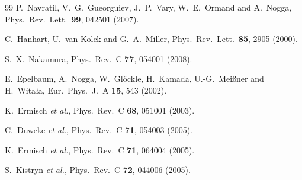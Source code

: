 \documentclass[aps,rmp,nofootinbib,twocolumn,floatfix]{revtex4}
\begin{document}
\begin{thebibliography}{99}
  P.~Navratil, V.~G.~Gueorguiev, J.~P.~Vary, W.~E.~Ormand and A.~Nogga,
  Phys.\ Rev.\ Lett.\  {\bf 99}, 042501 (2007).

  C.~Hanhart, U.~van Kolck and G.~A.~Miller,
  Phys.\ Rev.\ Lett.\  {\bf 85}, 2905 (2000).

  S.~X.~Nakamura,
  Phys.\ Rev.\  C {\bf 77}, 054001 (2008).


  E.~Epelbaum, A.~Nogga, W.~Gl\"ockle, H.~Kamada, U.-G.~Mei\ss ner and H.~Wita{\l}a,
  Eur.\ Phys.\ J.\  A {\bf 15}, 543 (2002).


  K.~Ermisch {\it et al.},
  Phys.\ Rev.\  C {\bf 68}, 051001 (2003).

  C.~Duweke {\it et al.},
  Phys.\ Rev.\  C {\bf 71}, 054003 (2005).

  K.~Ermisch {\it et al.},
  Phys.\ Rev.\  C {\bf 71}, 064004 (2005).

  S.~Kistryn {\it et al.},
  Phys.\ Rev.\  C {\bf 72}, 044006 (2005).


\end{thebibliography}
\end{document}
